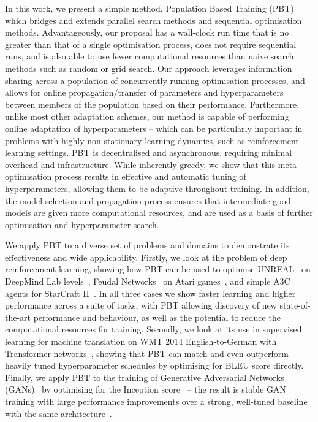 In this work, we present a simple method, Population Based Training (PBT) which bridges and extends parallel search methods and sequential optimisation methods.
%
Advantageously, our proposal has a wall-clock run time that is no greater than that of a single optimisation process, does not require sequential runs, and is also able to use fewer computational resources than naive search methods such as random or grid search.
%
Our approach leverages information sharing across a population of concurrently running optimisation processes, and allows for online propagation/transfer of parameters and hyperparameters between members of the population based on their performance. Furthermore, unlike most other adaptation schemes, our method is capable of performing online adaptation of hyperparameters -- which can be particularly important in problems with highly non-stationary learning dynamics, such as reinforcement learning settings.
%
PBT is decentralised and asynchronous, requiring minimal overhead and infrastructure. While inherently greedy, we show that this meta-optimisation process results in effective and automatic tuning of hyperparameters, allowing them to be adaptive throughout training. In addition, the model selection and propagation process ensures that intermediate good models are given more computational resources, and are used as a basis of further optimisation and hyperparameter search. 

We apply PBT to a diverse set of problems and domains to demonstrate its effectiveness and wide applicability. Firstly, we look at the problem of deep reinforcement learning, showing how PBT can be used to optimise UNREAL~\citep{jaderberg2016reinforcement} on DeepMind Lab levels~\citep{beattie2016deepmind}, Feudal Networks~\citep{vezhnevets2017feudal} on Atari games~\citep{bellemare2013arcade}, and simple A3C agents for StarCraft II~\citep{vinyals2017starcraft}. In all three cases we show faster learning and higher performance across a suite of tasks, with PBT allowing discovery of new state-of-the-art performance and behaviour, as well as the potential to reduce the computational resources for training. Secondly, we look at its use in supervised learning for machine translation on WMT 2014 English-to-German with Transformer networks~\citep{vaswani2017attention}, showing that PBT can match and even outperform heavily tuned hyperparameter schedules by optimising for BLEU score directly. Finally, we apply PBT to the training of Generative Adversarial Networks (GANs)~\citep{goodfellowgan} by optimising for the Inception score~\citep{openaigan} -- the result is stable GAN training with
large performance improvements over a strong, well-tuned baseline with the same architecture~\citep{dcgan}.

